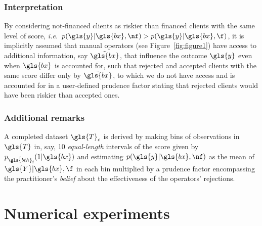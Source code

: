 \subsubsection{Interpretation}
By considering not-financed clients as riskier than financed clients with the same level of \gls{score}, \textit{i.e.}\ $p(\gls{y} | \gls{bx}, \nf) > p(\gls{y} | \gls{bx}, \f)$, it is implicitly assumed that manual operators (see Figure~\ref{fig:figure1}) have access to additional information, say $\tilde{\gls{bx}}$, that influence the outcome $\gls{y}$ even when $\gls{bx}$ is accounted for, such that rejected and accepted clients with the same \gls{score} differ only by $\tilde{\gls{bx}}$, to which we do not have access and is accounted for in a user-defined prudence factor stating that rejected clients would have been riskier than accepted ones.

\subsubsection{Additional remarks}
A completed dataset $\gls{T}_c$ is derived by making bins of observations in $\gls{T}$ in, say, 10 \textit{equal-length} intervals of the \gls{score} given by $p_{\hat{\gls{bth}}_\text{f}}(1 | \gls{bx})$ and estimating $p(\gls{y} | \gls{bx}, \nf)$ as the mean of $\gls{Y} | \gls{bx}, \f$ in each bin multiplied by a prudence factor encompassing the practitioner's \textit{belief} about the effectiveness of the operators' rejections.

%

\section{Numerical experiments} \label{sec:num_exp_reject}

